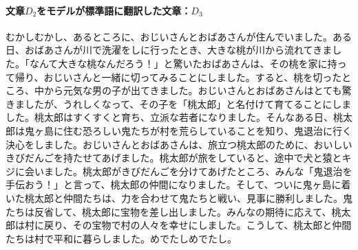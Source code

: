 \paragraph{文章$D_2$をモデルが標準語に翻訳した文章：$D_3$}
むかしむかし、あるところに、おじいさんとおばあさんが住んでいました。ある日、おばあさんが川で洗濯をしに行ったとき、大きな桃が川から流れてきました。「なんて大きな桃なんだろう！」と驚いたおばあさんは、その桃を家に持って帰り、おじいさんと一緒に切ってみることにしました。すると、桃を切ったところ、中から元気な男の子が出てきました。おじいさんとおばあさんはとても驚きましたが、うれしくなって、その子を「桃太郎」と名付けて育てることにしました。桃太郎はすくすくと育ち、立派な若者になりました。そんなある日、桃太郎は鬼ヶ島に住む恐ろしい鬼たちが村を荒らしていることを知り、鬼退治に行く決心をしました。おじいさんとおばあさんは、旅立つ桃太郎のために、おいしいきびだんごを持たせてあげました。桃太郎が旅をしていると、途中で犬と猿とキジに会いました。桃太郎がきびだんごを分けてあげたところ、みんな「鬼退治を手伝おう！」と言って、桃太郎の仲間になりました。そして、ついに鬼ヶ島に着いた桃太郎と仲間たちは、力を合わせて鬼たちと戦い、見事に勝利しました。鬼たちは反省して、桃太郎に宝物を差し出しました。みんなの期待に応えて、桃太郎は村に戻り、その宝物で村の人々を幸せにしました。こうして、桃太郎と仲間たちは村で平和に暮らしました。めでたしめでたし。
